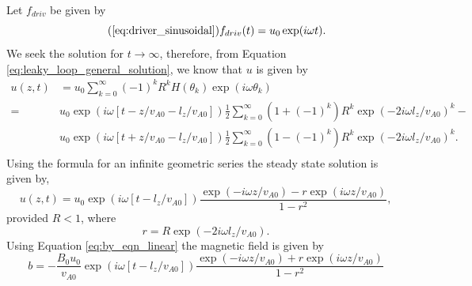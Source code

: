 Let $f_{driv}$ be given by
\begin{equation}
    \tag{\ref{eq:driver_sinusoidal}}
    f_{driv}(t)=u_0\exp(i\omega t).
\end{equation}
We seek the solution for $t \rightarrow\infty$, therefore, from Equation \eqref{eq:leaky_loop_general_solution}, we know that $u$ is given by
\[
    \begin{aligned}
    u(z,t) &= u_0\sum_{k=0}^\infty(-1)^kR^kH(\theta_k)\exp(i\omega\theta_k) \\
=&u_0\exp(i\omega[t-z/v_{A0}-l_z/v_{A0}])\frac{1}{2}\sum_{k=0}^{\infty}(1+(-1)^k)R^k\exp(-2i\omega l_z/v_{A0})^k-\\
&u_0\exp(i\omega[t+z/v_{A0}-l_z/v_{A0}])\frac{1}{2}\sum_{k=0}^{\infty}(1-(-1)^k)R^k\exp(-2i\omega l_z/v_{A0})^k. \\
    \end{aligned}
\]
Using the formula for an infinite geometric series the steady state solution is given by,
\begin{equation}
    \label{eq:leaky_steady_state_u}
    u(z,t) = u_0\exp(i\omega[t - l_z/v_{A0}])\frac{\exp(-i\omega z / v_{A0})-r\exp(i\omega z / v_{A0})}{1-r^2},
\end{equation}
provided $R<1$, where
\begin{equation}
    \label{eq:lower_case_r}
    r = R\exp(-2i\omega l_z / v_{A0}).
\end{equation}
Using Equation \eqref{eq:by_eqn_linear} the magnetic field is given by
\begin{equation}
    \label{eq:leaky_steady_state_b}
    b= -\frac{B_0u_0}{v_{A0}}\exp(i\omega[t - l_z/v_{A0}])\frac{\exp(-i\omega z / v_{A0})+r\exp(i\omega z / v_{A0})}{1-r^2}
\end{equation}

